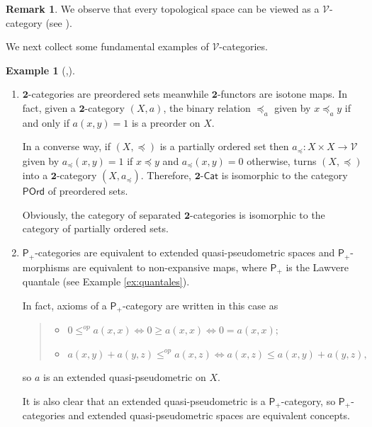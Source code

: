 \documentclass[11pt,a4paper]{amsart}
\theoremstyle{definition}
\newtheorem{example}[theorem]{Example}
\newtheorem{remark}[theorem]{Remark}
\begin{document}
	\begin{remark}
		We observe that every topological space can be viewed as a $\mathscr{V}$-category (see \cite{Flagg97,Kopp88}).
	\end{remark}
	
	We next collect some fundamental examples of $\mathscr{V}$-categories.
	
	\begin{example}[\mbox{\cite[Examples III.1.3.1]{BookMonoidalTopology},\cite{HofReis13}}]\label{ex:vcat}\
		\begin{enumerate}[(1)]
			\item $\mathbf{2}$-categories are preordered sets meanwhile $\mathbf{2}$-functors are isotone maps. In fact, given a $\mathbf{2}$-category $(X,a)$, the binary relation $\preceq_a$ given by $x\preceq_a y$ if and only if $a(x,y)=1$ is a preorder on $X.$ 
			
			In a converse way, if $(X,\preceq)$ is a partially ordered set then $a_\preceq:X\times X\to\mathscr{V}$ given by $a_{\preceq}(x,y)=1$ if $x\preceq y$ and $a_{\preceq}(x,y)=0$ otherwise, turns $(X,\preceq)$ into a $\mathbf{2}$-category $(X,a_\preceq)$.
			Therefore, $\mathbf{2}$-$\mathsf{Cat}$ is isomorphic to the category $\mathsf{POrd}$ of preordered sets. 
			
			Obviously, the category of separated $\mathbf{2}$-categories is isomorphic to the category of partially ordered sets.
			
			
			\item  $\mathsf{P}_+$-categories are equivalent to extended quasi-pseudometric spaces and $\mathsf{P}_+$-morphisms are equivalent to non-expansive maps, where $\mathsf{P}_+$ is the Lawvere quantale (see Example \ref{ex:quantales}).
			
			\noindent In fact, axioms of a $\mathsf{P}_+$-category are written in this case as
			\begin{quote}
				\begin{itemize}
					\item[(VC1)] $ 0\leq^{op} a(x,x)\Leftrightarrow  0\geq a(x,x)\Leftrightarrow 0=a(x,x);$
					\item[(VC2)] $a(x,y)+a(y,z)\leq^{op}a(x,z)\Leftrightarrow a(x,z)\leq a(x,y)+a(y,z),$
				\end{itemize}
			\end{quote}
			so $a$ is an extended quasi-pseudometric on $X.$
			
			It is also clear that an extended quasi-pseudometric is a $\mathsf{P}_+$-category, so $\mathsf{P}_+$-categories and extended quasi-pseudometric spaces are equivalent concepts. 
			

\end{enumerate}
\end{example}
\end{document}
